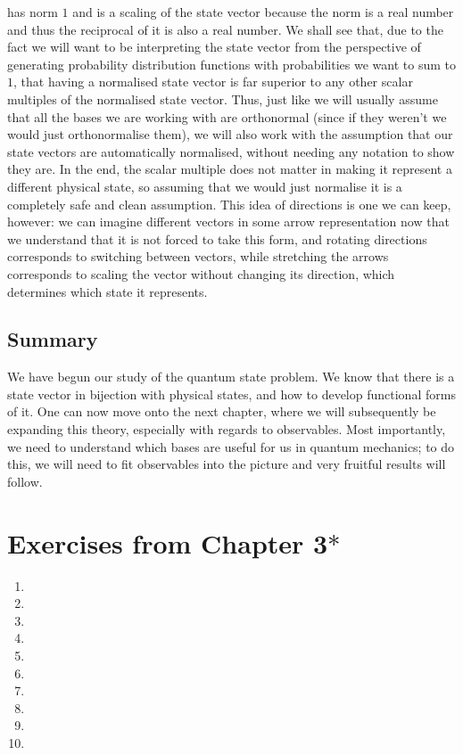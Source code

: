 has norm $1$ and is a scaling of the state vector because the norm is a real number and thus the reciprocal of it is also a real number. We shall see that, due to the fact we will want to be interpreting the state vector from the perspective of generating probability distribution functions with probabilities we want to sum to $1$, that having a normalised state vector is far superior to any other scalar multiples of the normalised state vector. Thus, just like we will usually assume that all the bases we are working with are orthonormal (since if they weren't we would just orthonormalise them), we will also work with the assumption that our state vectors are automatically normalised, without needing any notation to show they are. In the end, the scalar multiple does not matter in making it represent a different physical state, so assuming that we would just normalise it is a completely safe and clean assumption. This idea of directions is one we can keep, however: we can imagine different vectors in some arrow representation now that we understand that it is not forced to take this form, and rotating directions corresponds to switching between vectors, while stretching the arrows corresponds to scaling the vector without changing its direction, which determines which state it represents.
\subsection{Summary}
We have begun our study of the quantum state problem. We know that there is a state vector in bijection with physical states, and how to develop functional forms of it. One can now move onto the next chapter, where we will subsequently be expanding this theory, especially with regards to observables. Most importantly, we need to understand which bases are useful for us in quantum mechanics; to do this, we will need to fit observables into the picture and very fruitful results will follow. 
\section{Exercises from Chapter 3$\ast$}
\begin{enumerate}
    \item 
    \item
    \item
    \item
    \item
    \item
    \item
    \item
    \item
    \item
\end{enumerate}